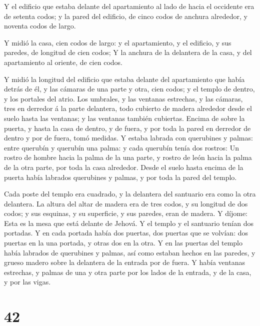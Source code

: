  Y el edificio que estaba delante del apartamiento al lado
de hacia el occidente era de setenta codos; y la pared del edificio, de
cinco codos de anchura alrededor, y noventa codos de largo.

 Y midió la casa, cien codos de largo: y el apartamiento, y
el edificio, y sus paredes, de longitud de cien codos;  Y
la anchura de la delantera de la casa, y del apartamiento al oriente, de
cien codos.

 Y midió la longitud del edificio que estaba delante del
apartamiento que había detrás de él, y las cámaras de una parte y otra,
cien codos; y el templo de dentro, y los portales del atrio.
 Los umbrales, y las ventanas estrechas, y las cámaras,
tres en derredor á la parte delantera, todo cubierto de madera alrededor
desde el suelo hasta las ventanas; y las ventanas también cubiertas.
 Encima de sobre la puerta, y hasta la casa de dentro, y de
fuera, y por toda la pared en derredor de dentro y por de fuera, tomó
medidas.  Y estaba labrada con querubines y palmas: entre
querubín y querubín una palma: y cada querubín tenía dos rostros:
 Un rostro de hombre hacia la palma de la una parte, y
rostro de león hacia la palma de la otra parte, por toda la casa
alrededor.  Desde el suelo hasta encima de la puerta había
labrados querubines y palmas, y por toda la pared del templo.

 Cada poste del templo era cuadrado, y la delantera del
santuario era como la otra delantera.  La altura del altar
de madera era de tres codos, y su longitud de dos codos; y sus esquinas,
y su superficie, y sus paredes, eran de madera. Y díjome: Esta es la
mesa que está delante de Jehová.  Y el templo y el
santuario tenían dos portadas.  Y en cada portada había dos
puertas, dos puertas que se volvían: dos puertas en la una portada, y
otras dos en la otra.  Y en las puertas del templo había
labrados de querubines y palmas, así como estaban hechos en las paredes,
y grueso madero sobre la delantera de la entrada por de fuera.
 Y había ventanas estrechas, y palmas de una y otra parte
por los lados de la entrada, y de la casa, y por las vigas.

\hypertarget{section-41}{%
\section{42}\label{section-41}}

